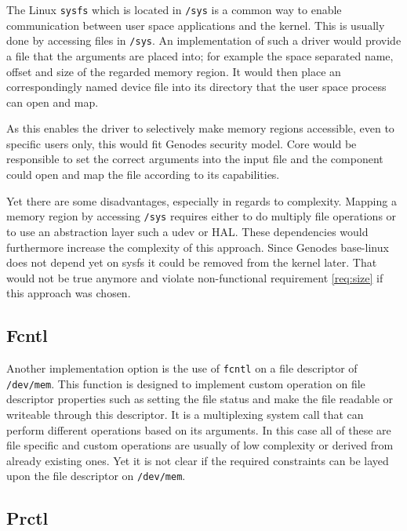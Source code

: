 \documentclass[
a4paper,
11pt,
twoside
]{report}
\begin{document}
		The Linux \texttt{sysfs} which is located in \texttt{/sys} is a common way to enable communication between user space applications and the kernel.
		This is usually done by accessing files in \texttt{/sys}.
		An implementation of such a driver would provide a file that the arguments are placed into; for example the space separated name, offset and size of the regarded memory region.
		It would then place an correspondingly named device file into its directory that the user space process can open and map. \citep{sysfs}
		
		As this enables the driver to selectively make memory regions accessible, even to specific users only, this would fit Genodes security model.
		Core would be responsible to set the correct arguments into the input file and the component could open and map the file according to its capabilities.
		
		Yet there are some disadvantages, especially in regards to complexity.
		Mapping a memory region by accessing \texttt{/sys} requires either to do multiply file operations or to use an abstraction layer such a udev or HAL.
		These dependencies would furthermore increase the complexity of this approach.
		Since Genodes base-linux does not depend yet on sysfs it could be removed from the kernel later.
		That would not be true anymore and violate non-functional requirement \ref{req:size} if this approach was chosen. \citep{sysfs}
		
		\subsection{Fcntl}
		
		Another implementation option is the use of \texttt{fcntl} on a file descriptor of \texttt{/dev/mem}.
		This function is designed to implement custom operation on file descriptor properties such as setting the file status and make the file readable or writeable through this descriptor.
		It is a multiplexing system call that can perform different operations based on its arguments.
		In this case all of these are file specific and custom operations are usually of low complexity or derived from already existing ones.
		Yet it is not clear if the required constraints can be layed upon the file descriptor on \texttt{/dev/mem}. \citep{syscall} \citep{fcntl}
		
		\subsection{Prctl}
		
\end{document}
